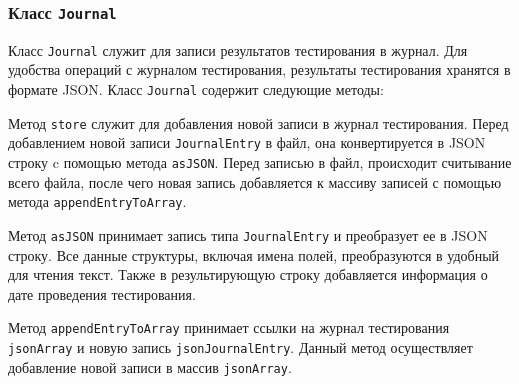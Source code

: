 \subsubsection{Класс \texttt{Journal}}
Класс \texttt{Journal} служит для записи результатов тестирования в журнал. Для удобства операций с журналом
тестирования, результаты тестирования хранятся в формате JSON. Класс \texttt{Journal} содержит следующие методы:
\begin{enum}
	\item Метод \texttt{store} служит для добавления новой записи в журнал тестирования. Перед добавлением новой
		записи \texttt{JournalEntry} в файл, она конвертируется в JSON строку c помощью метода \texttt{asJSON}.
		Перед записью в файл, происходит считывание всего файла, после чего новая запись добавляется к массиву
		записей с помощью метода \texttt{appendEntryToArray}.

	\item Метод \texttt{asJSON} принимает запись типа \texttt{JournalEntry} и преобразует ее в JSON строку.
		Все данные структуры, включая имена полей, преобразуются в удобный для чтения текст. Также в
		результирующую строку добавляется информация о дате проведения тестирования.

	\item Метод \texttt{appendEntryToArray} принимает ссылки на журнал тестирования \texttt{jsonArray} и новую
		запись \texttt{jsonJournalEntry}. Данный метод осуществляет добавление новой записи в массив
		\texttt{jsonArray}.
\end{enum}

